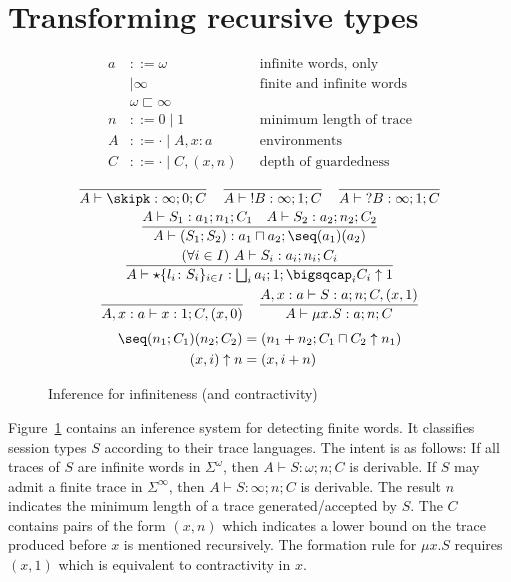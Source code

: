\appendix
\section{Transforming recursive types}
\label{sec:transf-recurs-types}


\begin{figure}[t]
  \begin{align*}
    a & ::= \omega && \text{infinite words, only} \\
    & \mid \infty && \text{finite and infinite words} \\
    & \omega \sqsubset \infty \\
    n & ::= 0 \mid 1 && \text{minimum length of trace} \\
    A & ::= \cdot \mid A, x:a && \text{environments} \\
    C & ::= \cdot \mid C, (x,n) && \text{depth of guardedness}
  \end{align*}
  \begin{gather*}
    \frac{}{A \vdash \skipk : \infty; 0; C }
    \quad
    \frac{}{A \vdash {!B} : \infty; 1; C}
    \quad
    \frac{}{A \vdash {?B} : \infty; 1; C}
    \\
    \frac{A \vdash S_1 : a_1;n_1;C_1 \quad A \vdash S_2 : a_2;n_2;C_2}{
      A \vdash (S_1;S_2) : a_1 \sqcap a_2;\seq(a_1)(a_2)}
    \\
    \frac{(\forall i\in I)~A \vdash S_i : a_i; n_i ; C_i}{
      A \vdash \star\{l_i\colon S_i\}_{i\in I} :
      \bigsqcup_i a_i; 
      1; \bigsqcap_i C_i \uparrow 1}
    \\
    \frac{}{A, x : a \vdash x : 1 ; C,(x,0)} \quad
    \frac{A, x : a \vdash S : a; n ; C, (x,1) }{A \vdash \mu x.S : a; n; C}
  \end{gather*}
  \begin{align*}
    \seq (n_1; C_1) (n_2; C_2) & = (n_1 + n_2 ; C_1 \sqcap C_2 \uparrow n_1
    ) \\
    (x, i) \uparrow n &= (x, i + n)
  \end{align*}
  \caption{Inference for infiniteness (and contractivity)}
  \label{fig:inference-infiniteness}
\end{figure}
Figure~\ref{fig:inference-infiniteness} contains an inference system for detecting finite words. It
classifies session types $S$ according to their trace languages. The intent is as follows: If all traces of $S$ are infinite
words in $\Sigma^\omega$, then $A \vdash S : \omega; n; C$ is derivable. If $S$ may admit a finite trace
in $\Sigma^\infty$, then $A \vdash S : \infty; n; C$ is derivable. The result $n$ indicates the
minimum length of a trace generated/accepted by $S$. The $C$ contains pairs of the form $(x,n)$
which indicates a lower bound on the trace produced before $x$ is mentioned recursively. The
formation rule for $\mu x.S$ requires $(x,1)$ which is equivalent to contractivity in $x$.


